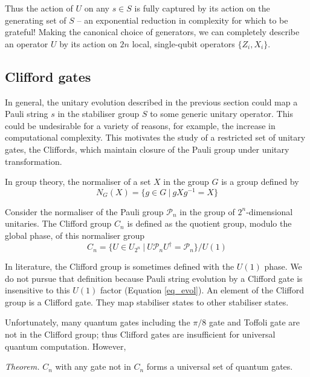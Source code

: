 \documentclass[10pt]{article}
\begin{document}
Thus the action of $U$ on any $s\in S$ is fully captured by its action on the generating set of $S$ -- an exponential reduction in complexity for which to be grateful! Making the canonical choice of generators, we can completely describe an operator $U$ by its action on $2n$ local, single-qubit operators $\{Z_i, X_i\}$.



\subsection{Clifford gates}

In general, the unitary evolution described in the previous section could map a Pauli string $s$ in the stabiliser group $S$ to some generic unitary operator. This could be undesirable for a variety of reasons, for example, the increase in computational complexity. This motivates the study of a restricted set of unitary gates, the Cliffords, which maintain closure of the Pauli group under unitary transformation.

In group theory, the normaliser of a set $X$ in the group $G$ is a group defined by
\begin{equation}
N_G(X) = \{g \in G \ | \ g X g^{-1} = X\}
\end{equation}

Consider the normaliser of the Pauli group $\mathcal{P}_n$ in the group of $2^n$-dimensional unitaries. The Clifford group $C_n$ is defined as the quotient group, modulo the global phase, of this normaliser group
\begin{equation}
C_n = \{U \in U_{2^n} \ | \ U \mathcal{P}_n U^\dagger = \mathcal{P}_n\} / U(1)
\end{equation}

In literature, the Clifford group is sometimes defined with the $U(1)$ phase. We do not pursue that definition because Pauli string evolution by a Clifford gate is insensitive to this $U(1)$ factor (Equation \ref{eq_evol}). An element of the Clifford group is a Clifford gate. They map stabiliser states to other stabiliser states.


Unfortunately, many quantum gates including the $\pi/8$ gate and Toffoli gate are not in the Clifford group; thus Clifford gates are insufficient for universal quantum computation. However,

\begin{displayquote}
\emph{Theorem.} $C_n$ with any gate not in $C_n$ forms a universal set of quantum gates.
\end{displayquote}
\end{document}
